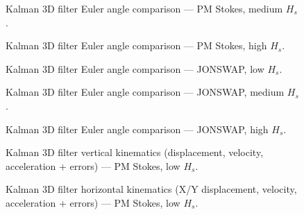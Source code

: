 \documentclass[11pt,letterpaper]{article}
\begin{document}
\begin{figure}[H]\centering
  \resizebox{\textwidth}{!}{}
  \caption{Kalman 3D filter Euler angle comparison — PM Stokes, medium $H_s$.}
  \label{fig:w3d_pmstokes_medium}
\end{figure}

\begin{figure}[H]\centering
  \resizebox{\textwidth}{!}{}
  \caption{Kalman 3D filter Euler angle comparison — PM Stokes, high $H_s$.}
  \label{fig:w3d_pmstokes_high}
\end{figure}

\begin{figure}[H]\centering
  \resizebox{\textwidth}{!}{}
  \caption{Kalman 3D filter Euler angle comparison — JONSWAP, low $H_s$.}
  \label{fig:w3d_jonswap_low}
\end{figure}

\begin{figure}[H]\centering
  \resizebox{\textwidth}{!}{}
  \caption{Kalman 3D filter Euler angle comparison — JONSWAP, medium $H_s$.}
  \label{fig:w3d_jonswap_medium}
\end{figure}

\begin{figure}[H]\centering
  \resizebox{\textwidth}{!}{}
  \caption{Kalman 3D filter Euler angle comparison — JONSWAP, high $H_s$.}
  \label{fig:w3d_jonswap_high}
\end{figure}



\begin{figure}[H]\centering
  \resizebox{\textwidth}{!}{}
  \caption{Kalman 3D filter vertical kinematics (displacement, velocity, acceleration + errors) — PM Stokes, low $H_s$.}
  \label{fig:w3d_pmstokes_low_zkin}
\end{figure}

\begin{figure}[H]\centering
  \resizebox{\textwidth}{!}{}
  \caption{Kalman 3D filter horizontal kinematics (X/Y displacement, velocity, acceleration + errors) — PM Stokes, low $H_s$.}
  \label{fig:w3d_pmstokes_low_xykin}
\end{figure}
\end{document}
